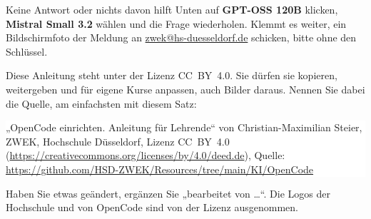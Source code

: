 \documentclass[a4paper,11pt]{article}
\makeatletter
\newcommand{\zwekmail}{\href{mailto:zwek@hs-duesseldorf.de}{zwek@hs-duesseldorf.de}}
\newcommand{\quelle}{https://github.com/HSD-ZWEK/Resources/tree/main/KI/OpenCode}
\makeatother
\begin{document}
\begin{problem}{Keine Antwort oder nichts davon hilft}
Unten auf \textbf{GPT-OSS 120B} klicken, \textbf{Mistral Small 3.2} wählen und
die Frage wiederholen. Klemmt es weiter, ein Bildschirmfoto der Meldung an
\zwekmail{} schicken, bitte ohne den Schlüssel.
\end{problem}

\begin{lizenz}\label{lizenz}
\begin{minipage}[t]{2.3cm}\vspace{0pt}{\fontsize{26}{26}\selectfont\color{hsddunkel}\ccby}\end{minipage}%
\begin{minipage}[t]{\dimexpr\linewidth-2.3cm}\vspace{0pt}\small
Diese Anleitung steht unter der Lizenz CC~BY~4.0. Sie dürfen sie kopieren,
weitergeben und für eigene Kurse anpassen, auch Bilder daraus. Nennen Sie dabei
die Quelle, am einfachsten mit diesem Satz:

\vspace{5pt}
\colorbox{white}{\parbox{\dimexpr\linewidth-2\fboxsep}{\footnotesize\RaggedRight
„OpenCode einrichten. Anleitung für Lehrende“ von Christian-Maximilian Steier,
ZWEK, Hochschule Düsseldorf, Lizenz CC~BY~4.0
(\url{https://creativecommons.org/licenses/by/4.0/deed.de}),
Quelle: \url{\quelle}}}

\vspace{5pt}\footnotesize\color{hsdgrau}
Haben Sie etwas geändert, ergänzen Sie „bearbeitet von …“. Die Logos der
Hochschule und von OpenCode sind von der Lizenz ausgenommen.
\end{minipage}
\end{lizenz}
\end{document}
